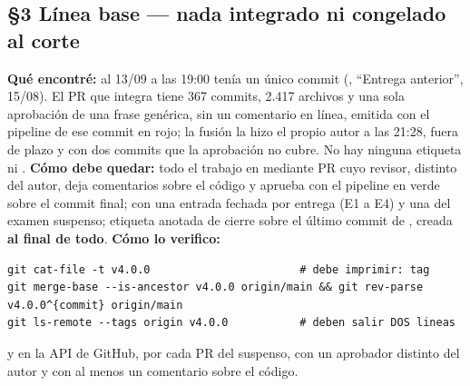 \subsection*{\S3 L\'inea base --- nada integrado ni congelado al corte}
\textbf{Qu\'e encontr\'e:} al 13/09 a las 19:00  ten\'ia un \'unico commit (, ``Entrega anterior'', 15/08). El PR que integra  tiene 367 commits, 2.417 archivos y una sola aprobaci\'on de una frase gen\'erica, sin un comentario en l\'inea, emitida con el pipeline de ese commit en rojo; la fusi\'on la hizo el propio autor a las 21:28, fuera de plazo y con dos commits que la aprobaci\'on no cubre. No hay ninguna etiqueta ni . \textbf{C\'omo debe quedar:} todo el trabajo en  mediante PR cuyo revisor, distinto del autor, deja comentarios sobre el c\'odigo y aprueba con el pipeline en verde sobre el commit final;  con una entrada fechada por entrega (E1 a E4) y una del examen suspenso; etiqueta anotada de cierre sobre el \'ultimo commit de , creada \textbf{al final de todo}. \textbf{C\'omo lo verifico:}\begin{verbatim}
git cat-file -t v4.0.0                       # debe imprimir: tag
git merge-base --is-ancestor v4.0.0 origin/main && git rev-parse v4.0.0^{commit} origin/main
git ls-remote --tags origin v4.0.0           # deben salir DOS lineas
\end{verbatim}
y en la API de GitHub, por cada PR del suspenso,  con un aprobador distinto del autor y  con al menos un comentario sobre el c\'odigo.

